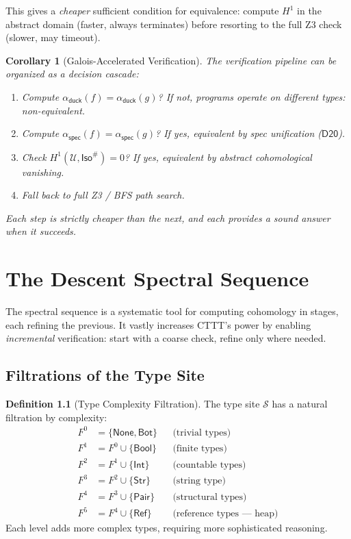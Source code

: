 \documentclass[11pt,a4paper]{report}
\theoremstyle{definition}
\newtheorem{definition}{Definition}[chapter]
\theoremstyle{plain}
\newtheorem{corollary}[definition]{Corollary}
\newcommand{\covers}{\mathcal{U}}
\newcommand{\Iso}{\mathsf{Iso}}
\newcommand{\Hone}{H^1}
\newcommand{\site}{\mathcal{S}}
\begin{document}
This gives a \emph{cheaper} sufficient condition for equivalence:
compute $\Hone$ in the abstract domain (faster, always terminates)
before resorting to the full Z3 check (slower, may timeout).

\begin{corollary}[Galois-Accelerated Verification]
The verification pipeline can be organized as a decision cascade:
\begin{enumerate}
  \item Compute $\alpha_\mathsf{duck}(f) = \alpha_\mathsf{duck}(g)$?
    If not, programs operate on different types: \emph{non-equivalent}.
  \item Compute $\alpha_\mathsf{spec}(f) = \alpha_\mathsf{spec}(g)$?
    If yes, \emph{equivalent} by spec unification ($\mathsf{D20}$).
  \item Check $\Hone(\covers, \Iso^\#) = 0$?  If yes,
    \emph{equivalent} by abstract cohomological vanishing.
  \item Fall back to full Z3 / BFS path search.
\end{enumerate}
Each step is strictly cheaper than the next, and each provides a
sound answer when it succeeds.
\end{corollary}


\chapter{The Descent Spectral Sequence}
\label{ch:spectral}

The spectral sequence is a systematic tool for computing cohomology
in stages, each refining the previous.  It vastly increases CTTT's
power by enabling \emph{incremental} verification: start with a
coarse check, refine only where needed.

\section{Filtrations of the Type Site}

\begin{definition}[Type Complexity Filtration]
The type site $\site$ has a natural filtration by complexity:
\begin{align}
  F^0 &= \{\mathsf{None}, \mathsf{Bot}\}
    && \text{(trivial types)} \\
  F^1 &= F^0 \cup \{\mathsf{Bool}\}
    && \text{(finite types)} \\
  F^2 &= F^1 \cup \{\mathsf{Int}\}
    && \text{(countable types)} \\
  F^3 &= F^2 \cup \{\mathsf{Str}\}
    && \text{(string type)} \\
  F^4 &= F^3 \cup \{\mathsf{Pair}\}
    && \text{(structural types)} \\
  F^5 &= F^4 \cup \{\mathsf{Ref}\}
    && \text{(reference types --- heap)}
\end{align}
Each level adds more complex types, requiring more sophisticated
reasoning.
\end{definition}
\end{document}
